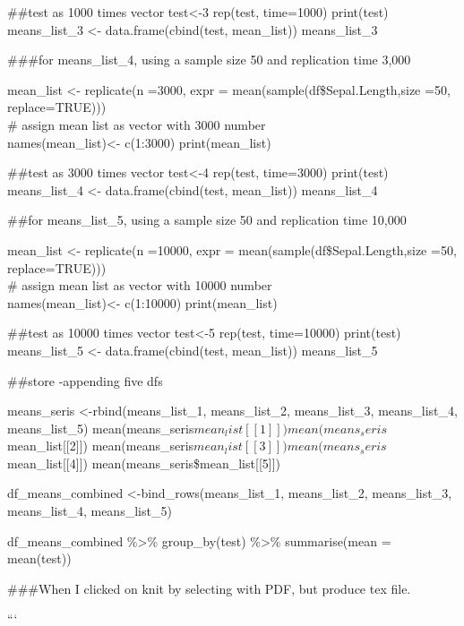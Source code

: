\documentclass[
]{article}
\begin{document}
\#\#test as 1000 times vector test\textless-3 rep(test, time=1000)
print(test) means\_list\_3 \textless- data.frame(cbind(test,
mean\_list)) means\_list\_3

\#\#\#for means\_list\_4, using a sample size 50 and replication time
3,000

mean\_list \textless- replicate(n =3000, expr =
mean(sample(df\$Sepal.Length,size =50, replace=TRUE)))\\
\# assign mean list as vector with 3000 number\\
names(mean\_list)\textless- c(1:3000) print(mean\_list)

\#\#test as 3000 times vector test\textless-4 rep(test, time=3000)
print(test) means\_list\_4 \textless- data.frame(cbind(test,
mean\_list)) means\_list\_4

\#\#for means\_list\_5, using a sample size 50 and replication time
10,000

mean\_list \textless- replicate(n =10000, expr =
mean(sample(df\$Sepal.Length,size =50, replace=TRUE)))\\
\# assign mean list as vector with 10000 number\\
names(mean\_list)\textless- c(1:10000) print(mean\_list)

\#\#test as 10000 times vector test\textless-5 rep(test, time=10000)
print(test) means\_list\_5 \textless- data.frame(cbind(test,
mean\_list)) means\_list\_5

\#\#store -appending five dfs

means\_seris \textless-rbind(means\_list\_1, means\_list\_2,
means\_list\_3, means\_list\_4, means\_list\_5)
mean(means\_seris\(mean_list[[1]]) mean(means_seris\)mean\_list{[}{[}2{]}{]})
mean(means\_seris\(mean_list[[3]]) mean(means_seris\)mean\_list{[}{[}4{]}{]})
mean(means\_seris\$mean\_list{[}{[}5{]}{]})

df\_means\_combined \textless-bind\_rows(means\_list\_1, means\_list\_2,
means\_list\_3, means\_list\_4, means\_list\_5)

df\_means\_combined \%\textgreater\% group\_by(test) \%\textgreater\%
summarise(mean = mean(test))

\#\#\#When I clicked on knit by selecting with PDF, but produce tex
file.

```
\end{document}
